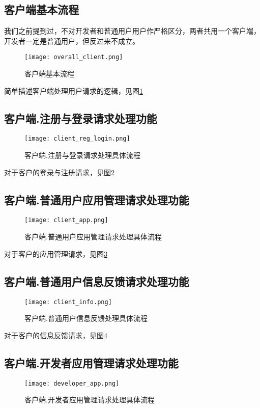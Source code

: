 \subsection{客户端基本流程}

我们之前提到过，不对开发者和普通用户用户作严格区分，两者共用一个客户端，开发者一定是普通用户，但反过来不成立。
\begin{figure}[ht]
	\centering
	\texttt{[image: overall\_client.png]}
	\caption{客户端基本流程} \label{fig:overall_client.png}
\end{figure}
简单描述客户端处理用户请求的逻辑，见图\ref{fig:overall_client.png}

\subsection{客户端.注册与登录请求处理功能}
\begin{figure}[ht]
	\centering
	\texttt{[image: client\_reg\_login.png]}
	\caption{客户端.注册与登录请求处理具体流程} \label{fig:client_reg_login.png}
\end{figure}

对于客户的登录与注册请求，见图\ref{fig:client_reg_login.png}

\subsection{客户端.普通用户应用管理请求处理功能}
\begin{figure}[ht]
	\centering
	\texttt{[image: client\_app.png]}
	\caption{客户端.普通用户应用管理请求处理具体流程} \label{fig:client_app.png}
\end{figure}

对于客户的应用管理请求，见图\ref{fig:client_app.png}

\subsection{客户端.普通用户信息反馈请求处理功能}
\begin{figure}[ht]
	\centering
	\texttt{[image: client\_info.png]}
	\caption{客户端.普通用户信息反馈处理具体流程} \label{fig:client_info.png}
\end{figure}

对于客户的信息反馈请求，见图\ref{fig:client_info.png}

\subsection{客户端.开发者应用管理请求处理功能}
\begin{figure}[ht]
	\centering
	\texttt{[image: developer\_app.png]}
	\caption{客户端.开发者应用管理请求处理具体流程} \label{fig:developer_app.png}
\end{figure}

